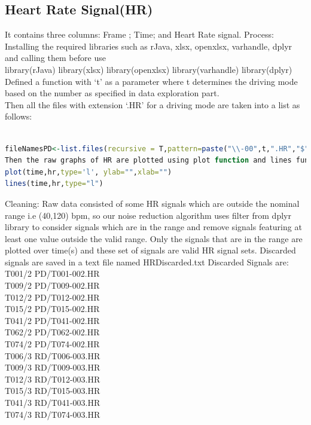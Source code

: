 \documentclass[a4paper]{article}
\begin{document}
\subsection{Heart Rate Signal(HR)}


It contains three columns: Frame ; Time; and Heart Rate signal.  
Process:\\
Installing the required libraries such as rJava, xlsx, openxlsx, varhandle, dplyr and calling them before use\\
library(rJava)
library(xlsx)
library(openxlsx)
library(varhandle)
library(dplyr)\\
Defined a function  with ‘t’ as a parameter where t determines the driving mode based on the number as specified in data exploration part.\\
Then all the files with extension ‘.HR’ for a driving mode are taken into a list as follows:
\begin{lstlisting}[language=R]

fileNamesPD<-list.files(recursive = T,pattern=paste("\\-00",t,".HR","$",sep = ""))
Then the raw graphs of HR are plotted using plot function and lines function.
plot(time,hr,type='l', ylab="",xlab="")
lines(time,hr,type="l")
\end{lstlisting}
Cleaning:
Raw data consisted of some HR signals which are outside the nominal range i.e (40,120) bpm, so our noise reduction algorithm uses filter from dplyr library to consider signals which are in the range and remove signals featuring at least one value outside the valid range. Only the signals that are in the range are plotted over time(s) and these set of signals are valid HR signal sets.
Discarded signals are saved in a text file named HRDiscarded.txt
Discarded Signals are:
T001/2 PD/T001-002.HR\\ 
T009/2 PD/T009-002.HR\\
T012/2 PD/T012-002.HR\\
T015/2 PD/T015-002.HR\\
T041/2 PD/T041-002.HR\\
T062/2 PD/T062-002.HR\\
T074/2 PD/T074-002.HR\\
T006/3 RD/T006-003.HR\\
T009/3 RD/T009-003.HR\\
T012/3 RD/T012-003.HR\\
T015/3 RD/T015-003.HR\\
T041/3 RD/T041-003.HR\\
T074/3 RD/T074-003.HR\\
\end{document}
